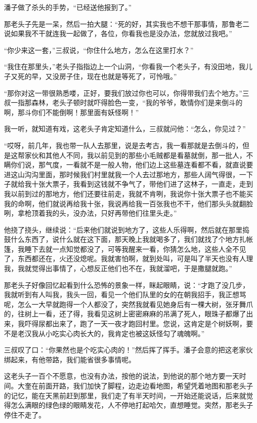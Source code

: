 潘子做了杀头的手势，“已经送他报到了。”

那老头子先是一呆，然后一拍大腿：“死的好，其实我也不想干那事情，那鲁老二说如果我不干就连我一起做了，各位，你看我也是没办法，您就放过我吧。”

“你少来这一套，”三叔说，“你住什么地方，怎么在这里打水？”

“我住在那里头，”老头子指指边上一个山洞，“你看我一个老头子，有没田地，我儿子又死的早，又没房子住，现在也就是等死了，可怜哦。”

“那你对这一带很熟悉喽，正好，要我们放过你也可以，你得带我们去个地方。”三叔一指那森林，老头子顿时就吓得脸色一变，“我的爷爷，敢情你们是来倒斗的啊，那斗你们不能倒啊！那里面有妖怪啊！”

我一听，就知道有戏，这老头子肯定知道什么，三叔就问他：“怎么，你见过？”

“哎呀，前几年，我也带一队人去那里，说是去考古，我一看那就是去倒斗的，但是这帮家伙和其他人不同，我以前见到的那些小毛贼都是看墓就倒，那一批人，不瞒你们说，那气度，一看就不是一般人物，他们边上这些墓连看都不看，就直说要进这山沟沟里面，那时候我们村里就我一个人去过那地方，那些人阔气得很，一下子就给我十张大票子，我看到这钱就不争气了，带他们进了这林子，一直走，走到我以前到过的那地方，他们还要往前走，我就不肯咧，我说你十张大票子也不能买我的命啊，他们就说再给我十张，我说再给我一百张我也不干，他们那头头就翻脸咧，拿枪顶着我的头，没办法，只好再带他们往里头走。”

他挠了挠头，继续说：“后来他们就说到地方了，这些人乐得啊，然后就在那里捣鼓什么东西了，说什么就在这下面，那天晚上我就喝多了，我们就找了个地方扎帐篷，我睡下去就一点知觉都没了，可等我醒来一看，你猜怎么地，这些人全不见了，东西都还在，火还没熄呢。我就害怕啊，就到处叫，可是叫了半天也没有人理我，我就觉得出事情了，心想反正他们也不在，我就溜吧，于是撒腿就跑。”

那老头子好像回忆起看到什么恐怖的景象一样，眯起眼睛，说：“才跑了没几步，我就听到有人叫我，我头一回，看见一个他们队里的女的在朝我招手，我正想骂呢，怎么一大早就跑得一个人都没了，突然我就看见她身后有一棵大树，张牙舞爪的，往树上一看，还了得，我看见这树上密密麻麻的吊满了死人，眼珠子都爆了出来，我吓得尿都出来了，跑了一天一夜才跑回村里。您说，这肯定是个树妖啊，要不是老汉我从小吃实心肉长大的，我肯定也被这妖怪勾了魂魄啊。”

三叔叹了口：“你果然也是个吃实心肉的！”然后挥了挥手。潘子会意的把这老家伙绑起来，有他带路，我们能省很多事情呢。

这老头子一百个不愿意，也没有办法，按他的说法，到他说的那个地方要一天时间。大奎在前面开路，我们加快了脚程，边走边看地图，希望凭着地图和那老头子的记忆，能在天黑前赶到那里，我们走了有半天时间，一开始还能说话，后来就觉得怎么满眼的绿色绿的眼睛发花，人不停地打起哈欠，直想睡觉。突然，那老头子停住不走了。

